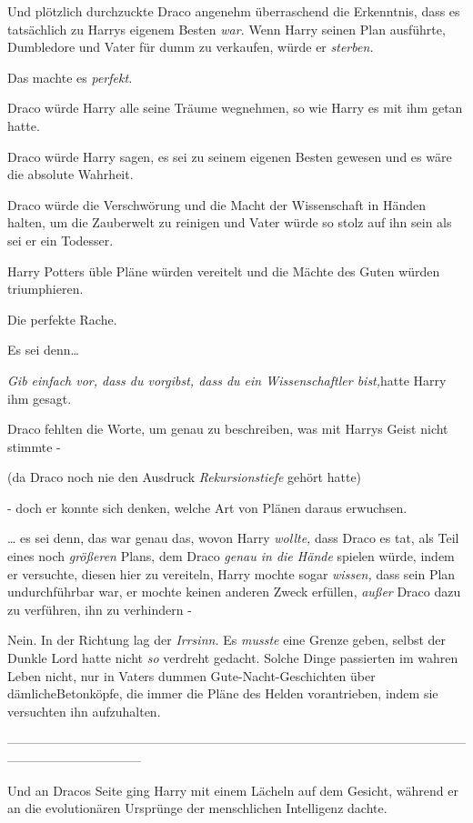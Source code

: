 {Und plötzlich durchzuckte Draco angenehm überraschend die Erkenntnis, dass es tatsächlich zu Harrys eigenem Besten \emph{war.} Wenn Harry seinen Plan ausführte, Dumbledore und Vater für dumm zu verkaufen, würde er \emph{sterben.}

Das machte es \emph{perfekt.}

Draco würde Harry alle seine Träume wegnehmen, so wie Harry es mit ihm getan hatte.

Draco würde Harry sagen, es sei zu seinem eigenen Besten gewesen und es wäre die absolute Wahrheit.

Draco würde die Verschwörung und die Macht der Wissenschaft in Händen halten, um die Zauberwelt zu reinigen und Vater würde so stolz auf ihn sein als sei er ein Todesser.

Harry Potters üble Pläne würden vereitelt und die Mächte des Guten würden triumphieren.

Die perfekte Rache.

Es sei denn…

\emph{Gib einfach vor, dass du vorgibst, dass du ein Wissenschaftler bist,}hatte Harry ihm gesagt.

Draco fehlten die Worte, um genau zu beschreiben, was mit Harrys Geist nicht stimmte -

(da Draco noch nie den Ausdruck \emph{Rekursionstiefe} gehört hatte)

- doch er konnte sich denken, welche Art von Plänen daraus erwuchsen.

… es sei denn, das war genau das, wovon Harry \emph{wollte,} dass Draco es tat, als Teil eines noch \emph{größeren} Plans, dem Draco \emph{genau in die Hände} spielen würde, indem er versuchte, diesen hier zu vereiteln, Harry mochte sogar \emph{wissen,} dass sein Plan undurchführbar war, er mochte keinen anderen Zweck erfüllen, \emph{außer} Draco dazu zu verführen, ihn zu verhindern -

Nein. In der Richtung lag der \emph{Irrsinn.} Es \emph{musste} eine Grenze geben, selbst der Dunkle Lord hatte nicht \emph{so} verdreht gedacht. Solche Dinge passierten im wahren Leben nicht, nur in Vaters dummen Gute-Nacht-Geschichten über dämlicheBetonköpfe, die immer die Pläne des Helden vorantrieben, indem sie versuchten ihn aufzuhalten.

--------------------------------------------------------------------------------------------------------------------------------------------

Und an Dracos Seite ging Harry mit einem Lächeln auf dem Gesicht, während er an die evolutionären Ursprünge der menschlichen Intelligenz dachte.

}
